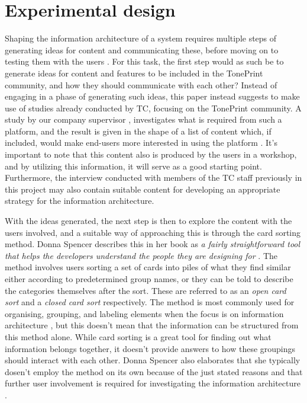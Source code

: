 \section{Experimental design}
\label{ExperimentalDesign}
Shaping the information architecture of a system requires multiple steps of generating ideas for content and communicating these, before moving on to testing them with the users \parencite[][356-364]{PDF:InformationArchitecture}. For this task, the first step would as such be to generate ideas for content and features to be included in the TonePrint community, and how they should communicate with each other? Instead of engaging in a phase of generating such ideas, this paper instead suggests to make use of studies already conducted by TC, focusing on the TonePrint community. A study by our company supervisor \textcite{PDF:BrugerWorkshopUserTonePrints}, investigates what is required from such a platform, and the result is given in the shape of a list of content which, if included, would make end-users more interested in using the platform \parencite[][35]{PDF:BrugerWorkshopUserTonePrints}. It's important to note that this content also is produced by the users in a workshop, and by utilizing this information, it will serve as a good starting point. Furthermore, the interview conducted with members of the TC staff previously in this project may also contain suitable content for developing an appropriate strategy for the information architecture.

With the ideas generated, the next step is then to explore the content with the users involved, and a suitable way of approaching this is through the card sorting method. Donna Spencer describes this in her book as \textit{a fairly straightforward tool that helps the developers understand the people they are designing for} \parencite[][6]{WEB:DonnaSpencer}. The method involves users sorting a set of cards into piles of what they find similar either according to predetermined group names, or they can be told to describe the categories themselves after the sort. These are referred to as an \textit{open card sort} and a \textit{closed card sort} respectively. The method is most commonly used for organising, grouping, and labeling elements when the focus is on information architecture \parencite[][10]{WEB:DonnaSpencer}, but this doesn't mean that the information can be structured from this method alone. While card sorting is a great tool for finding out what information belongs together, it doesn't provide answers to how these groupings should interact with each other. Donna Spencer also elaborates that she typically dosen't employ the method on its own because of the just stated reasons and that further user involvement is required for investigating the information architecture \parencite[][15]{WEB:DonnaSpencer}.

